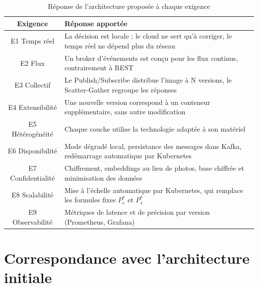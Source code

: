 \documentclass[11pt,a4paper]{report}
\begin{document}
\begin{table}[H]
\centering
\caption{Réponse de l'architecture proposée à chaque exigence}
\label{tab:justification}
\begin{tabularx}{\textwidth}{c L}
\toprule
{}\textbf{Exigence} & \textbf{Réponse apportée}\\
\midrule
E1 Temps réel & La décision est locale ; le cloud ne sert qu'à corriger, le temps réel ne dépend plus du réseau\\
E2 Flux & Un broker d'événements est conçu pour les flux continus, contrairement à REST\\
E3 Collectif & Le Publish/Subscribe distribue l'image à N versions, le Scatter-Gather regroupe les réponses\\
E4 Extensibilité & Une nouvelle version correspond à un conteneur supplémentaire, sans autre modification\\
E5 Hétérogénéité & Chaque couche utilise la technologie adaptée à son matériel\\
E6 Disponibilité & Mode dégradé local, persistance des messages dans Kafka, redémarrage automatique par Kubernetes\\
E7 Confidentialité & Chiffrement, embeddings au lieu de photos, base chiffrée et minimisation des données\\
E8 Scalabilité & Mise à l'échelle automatique par Kubernetes, qui remplace les formules fixes $P^{*}_{c}$ et $P^{*}_{s}$\\
E9 Observabilité & Métriques de latence et de précision par version (Prometheus, Grafana)\\
\bottomrule
\end{tabularx}
\end{table}

\section{Correspondance avec l'architecture initiale}
\end{document}
